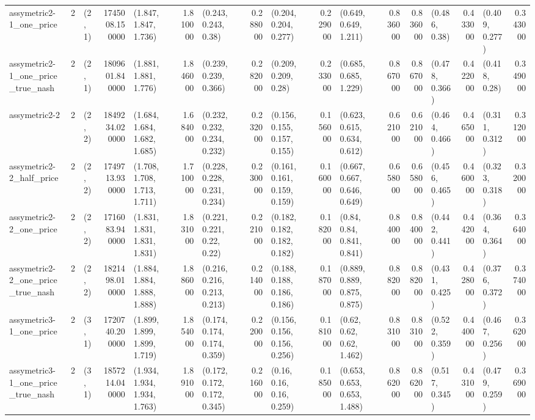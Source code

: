 \begin{tabular}{lrlrlrlrlrlrrlrlr}
assymetric2-1_one_price & 2 & (2, 1) & 1745008.150000 & (1.847, 1.847, 1.736) & 1.810000 & (0.243, 0.243, 0.38) & 0.288000 & (0.204, 0.204, 0.277) & 0.229000 & (0.649, 0.649, 1.211) & 0.836000 & 0.836000 & (0.486, 0.38) & 0.433000 & (0.409, 0.277) & 0.343000 \\
assymetric2-1_one_price_true_nash & 2 & (2, 1) & 1809601.840000 & (1.881, 1.881, 1.776) & 1.846000 & (0.239, 0.239, 0.366) & 0.282000 & (0.209, 0.209, 0.28) & 0.233000 & (0.685, 0.685, 1.229) & 0.867000 & 0.867000 & (0.478, 0.366) & 0.422000 & (0.418, 0.28) & 0.349000 \\
assymetric2-2 & 2 & (2, 2) & 1849234.020000 & (1.684, 1.684, 1.682, 1.685) & 1.684000 & (0.232, 0.232, 0.234, 0.232) & 0.232000 & (0.156, 0.155, 0.157, 0.155) & 0.156000 & (0.623, 0.615, 0.634, 0.612) & 0.621000 & 0.621000 & (0.464, 0.466) & 0.465000 & (0.311, 0.312) & 0.312000 \\
assymetric2-2_half_price & 2 & (2, 2) & 1749713.930000 & (1.708, 1.708, 1.713, 1.711) & 1.710000 & (0.228, 0.228, 0.231, 0.234) & 0.230000 & (0.161, 0.161, 0.159, 0.159) & 0.160000 & (0.667, 0.667, 0.646, 0.649) & 0.658000 & 0.658000 & (0.456, 0.465) & 0.460000 & (0.323, 0.318) & 0.320000 \\
assymetric2-2_one_price & 2 & (2, 2) & 1716083.940000 & (1.831, 1.831, 1.831, 1.831) & 1.831000 & (0.221, 0.221, 0.22, 0.22) & 0.221000 & (0.182, 0.182, 0.182, 0.182) & 0.182000 & (0.84, 0.84, 0.841, 0.841) & 0.840000 & 0.840000 & (0.442, 0.441) & 0.442000 & (0.364, 0.364) & 0.364000 \\
assymetric2-2_one_price_true_nash & 2 & (2, 2) & 1821498.010000 & (1.884, 1.884, 1.888, 1.888) & 1.886000 & (0.216, 0.216, 0.213, 0.213) & 0.214000 & (0.188, 0.188, 0.186, 0.186) & 0.187000 & (0.889, 0.889, 0.875, 0.875) & 0.882000 & 0.882000 & (0.431, 0.425) & 0.428000 & (0.376, 0.372) & 0.374000 \\
assymetric3-1_one_price & 2 & (3, 1) & 1720740.200000 & (1.899, 1.899, 1.899, 1.719) & 1.854000 & (0.174, 0.174, 0.174, 0.359) & 0.220000 & (0.156, 0.156, 0.156, 0.256) & 0.181000 & (0.62, 0.62, 0.62, 1.462) & 0.831000 & 0.831000 & (0.522, 0.359) & 0.440000 & (0.467, 0.256) & 0.362000 \\
assymetric3-1_one_price_true_nash & 2 & (3, 1) & 1857214.040000 & (1.934, 1.934, 1.934, 1.763) & 1.891000 & (0.172, 0.172, 0.172, 0.345) & 0.216000 & (0.16, 0.16, 0.16, 0.259) & 0.185000 & (0.653, 0.653, 0.653, 1.488) & 0.862000 & 0.862000 & (0.517, 0.345) & 0.431000 & (0.479, 0.259) & 0.369000 \\

\end{tabular}
